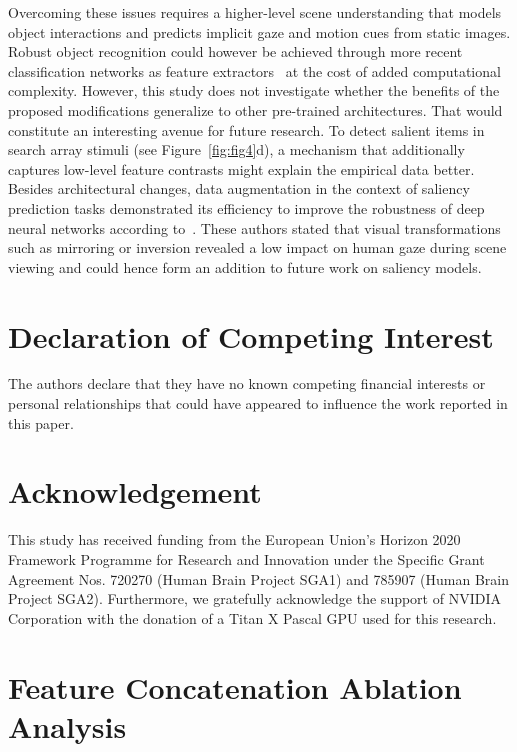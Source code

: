 \documentclass[final,1p,times,number]{elsarticle}
\begin{document}
Overcoming these issues requires a higher-level scene understanding that models object interactions and predicts implicit gaze and motion cues from static images. Robust object recognition could however be achieved through more recent classification networks as feature extractors~\cite{oyama2018influence} at the cost of added computational complexity. However, this study does not investigate whether the benefits of the proposed modifications generalize to other pre-trained architectures. That would constitute an interesting avenue for future research. To detect salient items in search array stimuli (see Figure~\ref{fig:fig4}d), a mechanism that additionally captures low-level feature contrasts might explain the empirical data better. Besides architectural changes, data augmentation in the context of saliency prediction tasks demonstrated its efficiency to improve the robustness of deep neural networks according to~\citet{che2018invariance}. These authors stated that visual transformations such as mirroring or inversion revealed a low impact on human gaze during scene viewing and could hence form an addition to future work on saliency models.

\section*{Declaration of Competing Interest}

The authors declare that they have no known competing financial interests or personal relationships that could have appeared to influence the work reported in this paper.

\section*{Acknowledgement}

This study has received funding from the European Union's Horizon 2020 Framework Programme for Research and Innovation under the Specific Grant Agreement Nos. 720270 (Human Brain Project SGA1) and 785907 (Human Brain Project SGA2). Furthermore, we gratefully acknowledge the support of NVIDIA Corporation with the donation of a Titan X Pascal GPU used for this research.




\newpage
\appendix

\section{Feature Concatenation Ablation Analysis}
\label{app:app1}
\end{document}
